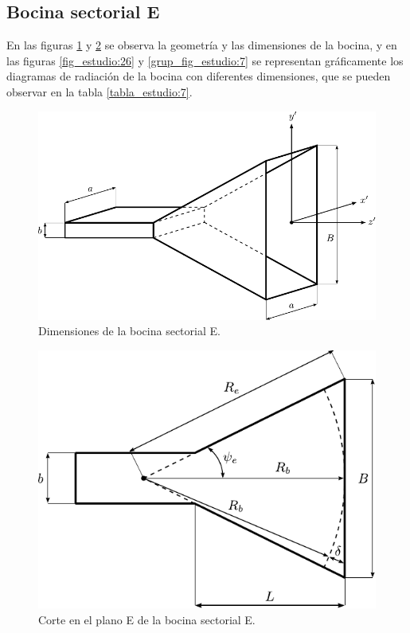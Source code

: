 \subsection{Bocina sectorial E}
\label{subsec_estudio_boci_sece}

En las figuras \ref{fig_estudio:24} y \ref{fig_estudio:25} se observa la geometría y las dimensiones de la bocina, y en las figuras \ref{fig_estudio:26} y \ref{grup_fig_estudio:7} se representan gráficamente los diagramas de radiación de la bocina con diferentes dimensiones, que se pueden observar en la tabla \ref{tabla_estudio:7}.
\begin{figure}[H]
\centering
\includegraphics[scale = 1]{Figures/Estudio/estudio_24}
\caption{Dimensiones de la bocina sectorial E.}
\label{fig_estudio:24}
\end{figure}
\begin{figure}[H]
\centering
\includegraphics[scale = 1]{Figures/Estudio/estudio_25}
\caption{Corte en el plano E de la bocina sectorial E.}
\label{fig_estudio:25}
\end{figure}
